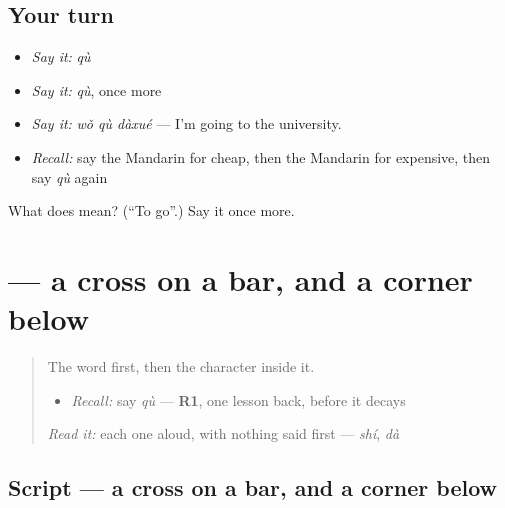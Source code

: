\subsection*{Your turn}
\begin{itemize}
\raggedright
  \item \emph{Say it:} \emph{qù}
  \item \emph{Say it:} \emph{qù}, once more
  \item \emph{Say it:} \emph{wǒ qù dàxué} — I'm going to the university.
  \item \emph{Recall:} say the Mandarin for cheap, then the Mandarin for expensive, then say \emph{qù} again
\end{itemize}

\begin{tcolorbox}[breakable,colback=teal!4,colframe=teal!35!black,title={Before you move on}]
What does  mean? (\textquotedblleft{}To go\textquotedblright{}.) Say it once more.
\end{tcolorbox}
\section[\texorpdfstring{\zh{去} (qù)}{去 (qù)}]{ — a cross on a bar, and a corner below}

\label{lesson:ZH-W43-qu}



\begin{quote}
The word first, then the character inside it.

\begin{itemize}
\raggedright
  \item \emph{Recall:} say \emph{qù} — \textbf{R1}, one lesson back, before it decays
\end{itemize}

\begin{quote}
 
\end{quote}

\emph{Read it:} each one aloud, with nothing said first — \emph{shí}, \emph{dà}
\end{quote}

\subsection*{Script — a cross on a bar, and a corner below}

\begin{quote}
\end{quote}

